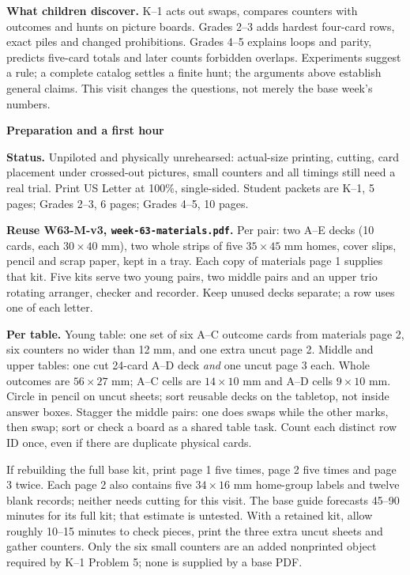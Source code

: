 \documentclass[11pt]{article}
\newcommand{\head}[1]{\par\textbf{\large #1}\par}
\newcommand{\row}[1]{\texttt{#1}}
\begin{document}
\textbf{What children discover.} K--1 acts out swaps, compares counters with outcomes and hunts on picture boards. Grades 2--3 adds hardest four-card rows, exact piles and changed prohibitions. Grades 4--5 explains loops and parity, predicts five-card totals and later counts forbidden overlaps. Experiments suggest a rule; a complete catalog settles a finite hunt; the arguments above establish general claims. This visit changes the questions, not merely the base week's numbers.
\newpage
\head{Preparation and a first hour}
\textbf{Status.} Unpiloted and physically unrehearsed: actual-size printing, cutting, card placement under crossed-out pictures, small counters and all timings still need a real trial. Print US Letter at 100\%, single-sided. Student packets are K--1, 5 pages; Grades 2--3, 6 pages; Grades 4--5, 10 pages.

\textbf{Reuse W63-M-v3, \row{week-63-materials.pdf}.} Per pair: two A--E decks (10 cards, each $30\times40$ mm), two whole strips of five $35\times45$ mm homes, cover slips, pencil and scrap paper, kept in a tray. Each copy of materials page 1 supplies that kit. Five kits serve two young pairs, two middle pairs and an upper trio rotating arranger, checker and recorder. Keep unused decks separate; a row uses one of each letter.

\textbf{Per table.} Young table: one set of six A--C outcome cards from materials page 2, six counters no wider than 12 mm, and one extra uncut page 2. Middle and upper tables: one cut 24-card A--D deck \emph{and} one uncut page 3 each. Whole outcomes are $56\times27$ mm; A--C cells are $14\times10$ mm and A--D cells $9\times10$ mm. Circle in pencil on uncut sheets; sort reusable decks on the tabletop, not inside answer boxes. Stagger the middle pairs: one does swaps while the other marks, then swap; sort or check a board as a shared table task. Count each distinct row ID once, even if there are duplicate physical cards.

If rebuilding the full base kit, print page 1 five times, page 2 five times and page 3 twice. Each page 2 also contains five $34\times16$ mm home-group labels and twelve blank records; neither needs cutting for this visit. The base guide forecasts 45--90 minutes for its full kit; that estimate is untested. With a retained kit, allow roughly 10--15 minutes to check pieces, print the three extra uncut sheets and gather counters. Only the six small counters are an added nonprinted object required by K--1 Problem 5; none is supplied by a base PDF.
\end{document}
